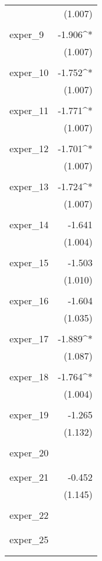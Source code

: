 \begin{table}[!htbp]
\begin{tabular}{@{\extracolsep{5pt}}lD{.}{.}{-3} }
  & (1.007) \\ 
  & \\ 
 exper\_9 & -1.906^{*} \\ 
  & (1.007) \\ 
  & \\ 
 exper\_10 & -1.752^{*} \\ 
  & (1.007) \\ 
  & \\ 
 exper\_11 & -1.771^{*} \\ 
  & (1.007) \\ 
  & \\ 
 exper\_12 & -1.701^{*} \\ 
  & (1.007) \\ 
  & \\ 
 exper\_13 & -1.724^{*} \\ 
  & (1.007) \\ 
  & \\ 
 exper\_14 & -1.641 \\ 
  & (1.004) \\ 
  & \\ 
 exper\_15 & -1.503 \\ 
  & (1.010) \\ 
  & \\ 
 exper\_16 & -1.604 \\ 
  & (1.035) \\ 
  & \\ 
 exper\_17 & -1.889^{*} \\ 
  & (1.087) \\ 
  & \\ 
 exper\_18 & -1.764^{*} \\ 
  & (1.004) \\ 
  & \\ 
 exper\_19 & -1.265 \\ 
  & (1.132) \\ 
  & \\ 
 exper\_20 &  \\ 
  &  \\ 
  & \\ 
 exper\_21 & -0.452 \\ 
  & (1.145) \\ 
  & \\ 
 exper\_22 &  \\ 
  &  \\ 
  & \\ 
 exper\_25 &  \\ 
  &  \\ 
  & \\ 

\end{tabular}
\end{table}
